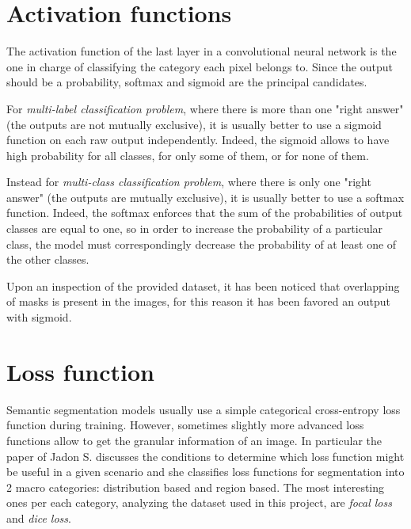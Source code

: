 \documentclass[a4paper,10pt]{report}
\begin{document}
\section{Activation functions}\label{sec:section-35}
The activation function of the last layer in a convolutional neural network is the one in charge of classifying the category each pixel belongs to. 
Since the output should be a probability, softmax
and sigmoid are the principal candidates. 

For \textit{multi-label classification problem}, where there is more than one "right answer" (the outputs are not mutually exclusive), it is usually better to use a sigmoid function on each raw output independently. Indeed, the sigmoid allows to have high probability for all classes, for only some of them, or for none of them.

Instead for \textit{multi-class classification problem}, where there is only one "right answer" (the outputs are mutually exclusive), it is usually better to use a softmax function. Indeed, the softmax enforces that the sum of the probabilities of output classes are equal to one, so in order to increase the probability of a particular class, the model must correspondingly decrease the probability of at least one of the other classes.

Upon an inspection of the provided dataset, it has been noticed that overlapping of masks is present in the images, for this reason it has been favored an output with sigmoid.

\section{Loss function}\label{sec:section-36}
Semantic segmentation models usually use a simple categorical cross-entropy loss function during training. However, sometimes slightly more advanced loss functions allow to get the granular information of an image.
In particular the paper of Jadon S. \cite{loss-segmentation} discusses the conditions to determine which loss function might be useful in a given scenario and she classifies loss functions for segmentation into 2 macro categories: distribution based and region based.
The most interesting ones per each category, analyzing the dataset used in this project, are \textit{focal loss} and \textit{dice loss}.
\end{document}
